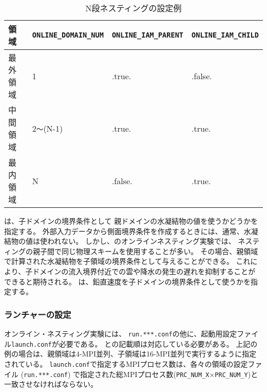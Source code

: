\begin{table}[htb]
\begin{center}
\caption{N段ネスティングの設定例}
\begin{tabularx}{150mm}{|l|l|l|X|} \hline
 \rowcolor[gray]{0.9} 領域 & \verb|ONLINE_DOMAIN_NUM| & \verb|ONLINE_IAM_PARENT| & \verb|ONLINE_IAM_CHILD|\\ \hline
 最外領域 & 1               & .true.  & .false. \\ \hline
 中間領域 & 2\verb|〜|(N-1) & .true.  & .true. \\ \hline
 最内領域 & N               & .false. & .true. \\ \hline
\end{tabularx}
\label{tab:triple_nested}
\end{center}
\end{table}

は、子ドメインの境界条件として
親ドメインの水凝結物の値を使うかどうかを指定する。
外部入力データから側面境界条件を作成するときには、通常、水凝結物の値は使われない。
しかし、\scalerm のオンラインネスティング実験では、
ネスティングの親子間で同じ物理スキームを使用することが多い。
その場合、親領域で計算された水凝結物を子領域の境界条件として与えることができる。
これにより、子ドメインの流入境界付近での雲や降水の発生の遅れを抑制することが
できると期待される。
は、鉛直速度を子ドメインの境界条件として使うかを指定する。


\subsubsection{ランチャーの設定}
\label{subsubsec:launch}
オンライン・ネスティング実験には、
\verb|run.***.conf|の他に、起動用設定ファイル\verb|launch.conf|が必要である。
との記載順は対応している必要がある。
上記の例の場合は、親領域は4-MPI並列、子領域は16-MPI並列で実行するように指定されている。
\verb|launch.conf|で指定するMPIプロセス数は、各々の領域の設定ファイル (\verb|run.***.conf|)
で指定された総MPIプロセス数(\verb|PRC_NUM_X|$\times$\verb|PRC_NUM_Y|)と一致させなければならない。

